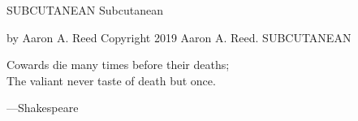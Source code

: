 \thispagestyle{empty}
SUBCUTANEAN
\clearpage
\thispagestyle{empty}
\null %
\clearpage
\thispagestyle{empty}
Subcutanean

by Aaron A. Reed
\clearpage
\thispagestyle{empty}
\null\vfill
Copyright 2019 Aaron A. Reed.
\clearpage
\thispagestyle{empty}
SUBCUTANEAN
\clearpage
\cleartorecto
\thispagestyle{empty}
\vspace*{10\nbs}
\begin{adjustwidth}{7em}{7em}
Cowards die many times before their deaths;\\
The valiant never taste of death but once.\par
\stake\hfill---Shakespeare\par
\end{adjustwidth}

\clearpage

